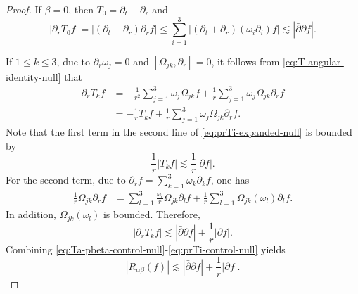 \documentclass[11pt,twoside]{article}
\def\ds{\displaystyle}
\def\p{\partial}
\theoremstyle{plain}
\theoremstyle{definition}
\theoremstyle{assumption}
\numberwithin{equation}{section}
\begin{document}
\begin{proof}
		If $\beta=0$, then $T_0=\partial_t+\partial_r$ and
		\begin{equation}\label{eq:prT0-control-null}
			|\partial_rT_0f|
			=
			|(\partial_t+\partial_r)\partial_rf|
			\le
			\sum_{i=1}^{3}|(\partial_t+\partial_r)(\omega_i\p_i)f|
			\lesssim
			|\bar\partial\partial f|.
		\end{equation}
		
		If $1\le k\le3$, due to $\partial_r\omega_j=0$ and $[\Omega_{jk},\partial_r]=0$, it follows from \eqref{eq:T-angular-identity-null}
        that
		\begin{equation}\label{eq:prTi-expanded-null}
			\begin{aligned}
				\partial_rT_k f
				&=
				-\frac1{r^2}\sum_{j=1}^3\omega_j\Omega_{jk}f
				+
				\frac1r\sum_{j=1}^3\omega_j\Omega_{jk}\partial_r f
				\\
				&=
				-\frac1rT_k f
				+
				\frac1r\sum_{j=1}^3\omega_j\Omega_{jk}\partial_r f.
			\end{aligned}
		\end{equation}
		Note that the first term in the second line of \eqref{eq:prTi-expanded-null} is bounded by
		\begin{equation*}
			\frac1r|T_k f|
			\lesssim
			\frac1r|\partial f|.
		\end{equation*}
		For the second term, due to $\partial_r f=\ds\sum_{k=1}^3\omega_k\partial_k f$, one has
		\begin{equation*}
			\begin{aligned}
				\frac1r\Omega_{jk}\partial_r f
				&=
				\sum_{l=1}^3
				\frac{\omega_l}{r}\Omega_{jk}\partial_l f
				+\frac1r\sum_{l=1}^3
				\Omega_{jk}(\omega_l)\partial_l f.
			\end{aligned}
		\end{equation*}
		In addition, $\Omega_{jk}(\omega_l)$ is bounded. Therefore,
		\begin{equation}\label{eq:prTi-control-null}
			|\partial_rT_k f|
			\lesssim
			|\bar\partial\partial f|
			+
			\frac1r|\partial f|.
		\end{equation}
		Combining
		\eqref{eq:Ta-pbeta-control-null}-\eqref{eq:prTi-control-null} yields
		\begin{equation}\label{eq:Rab-control-null}
			|R_{\alpha\beta}(f)|
			\lesssim
			|\bar\partial\partial f|
			+
			\frac1r|\partial f|.
		\end{equation}
		

\end{proof}
\end{document}
